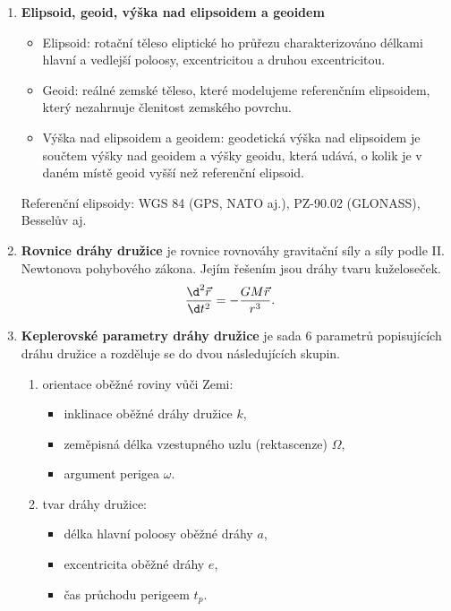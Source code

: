 \documentclass[11pt,a4paper]{article}
\begin{document}
\begin{enumerate}
    \item \textbf{Elipsoid, geoid, výška nad elipsoidem a geoidem}
    \begin{itemize}
        \item Elipsoid: rotační těleso eliptické ho průřezu charakterizováno délkami hlavní a vedlejší poloosy, excentricitou a druhou excentricitou.
        \item Geoid: reálné zemské těleso, které modelujeme referenčním elipsoidem, který nezahrnuje členitost zemského povrchu.
        \item Výška nad elipsoidem a geoidem: geodetická výška nad elipsoidem je součtem výšky nad geoidem a výšky geoidu, která udává, o kolik je v daném místě geoid vyšší než referenční elipsoid.
    \end{itemize}
    Referenční elipsoidy: WGS 84 (GPS, NATO aj.), PZ-90.02 (GLONASS), Besselův aj.
    
    \item \textbf{Rovnice dráhy družice} je rovnice rovnováhy gravitační síly a síly podle II. Newtonova pohybového zákona. Jejím řešením jsou dráhy tvaru kuželoseček.
    \begin{align}
        \frac{\d^2 \vec r}{\d t^2} &= -\frac{GM\vec r}{r^3}.
    \end{align}
    
    \item \textbf{Keplerovské parametry dráhy družice} je sada 6 parametrů popisujících dráhu družice a rozděluje se do dvou následujících skupin.
    \begin{enumerate}[label=\Roman*.]
        \item orientace oběžné roviny vůči Zemi:
        \begin{itemize}
            \item inklinace oběžné dráhy družice $k$,
            \item zeměpisná délka vzestupného uzlu (rektascenze) $\Omega$,
            \item argument perigea $\omega$.
        \end{itemize}
        \item tvar dráhy družice:
        \begin{itemize}
            \item délka hlavní poloosy oběžné dráhy $a$,
            \item excentricita oběžné dráhy $e$,
            \item čas průchodu perigeem $t_p$.
        \end{itemize}
    \end{enumerate}
    

\end{enumerate}
\end{document}
